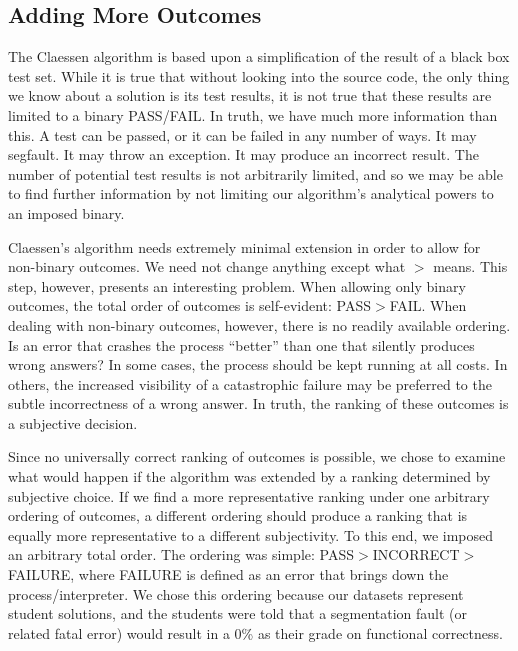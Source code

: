 \documentclass[11pt,twoside]{article}
\begin{document}
\subsection{Adding More Outcomes}
The Claessen algorithm is based upon a simplification of the result of a black box test set. While it is true that without looking into the source code, the only thing we know about a solution is its test results, it is not true that these results are limited to a binary PASS/FAIL. In truth, we have much more information than this. A test can be passed, or it can be failed in any  number of ways. It may segfault. It may throw an exception. It may produce an incorrect result. The number of potential test results is not arbitrarily limited, and so we may be able to find further information by not limiting our algorithm's analytical powers to an imposed binary.

Claessen's algorithm needs extremely minimal extension in order to allow for non-binary outcomes. We need not change anything except what $>$ means. This step, however, presents an interesting problem. When allowing only binary outcomes, the total order of outcomes is self-evident: PASS$>$FAIL. When dealing with non-binary outcomes, however, there is no readily available ordering. Is an error that crashes the process ``better'' than one that silently produces wrong answers? In some cases, the process should be kept running at all costs. In others, the increased visibility of a catastrophic failure may be preferred to the subtle incorrectness of a wrong answer. In truth, the ranking of these outcomes is a subjective decision.

Since no universally correct ranking of outcomes is possible, we chose to examine what would happen if the algorithm was extended by a ranking determined by subjective choice. If we find a more representative ranking under one arbitrary ordering of outcomes, a different ordering should produce a ranking that is equally more representative to a different subjectivity. To this end, we imposed an arbitrary total order. The ordering was simple: PASS$>$INCORRECT$>$FAILURE, where FAILURE is defined as an error that brings down the process/interpreter. We chose this ordering because our datasets represent student solutions, and the students were told that a segmentation fault (or related fatal error) would result in a 0\% as their grade on functional correctness.
\end{document}
